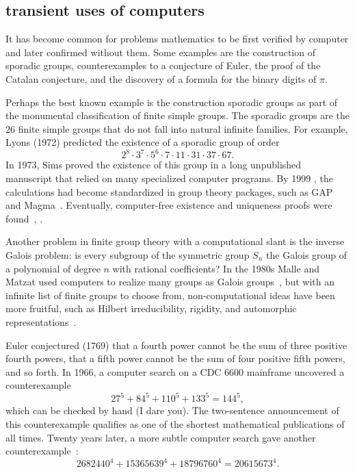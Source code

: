 \documentclass{llncs}
\begin{document}
\subsection{transient uses of computers}

It has become common for problems mathematics to be first verified by
computer and later confirmed without them.  Some examples are
the construction of sporadic groups, counterexamples to a conjecture
of Euler, the proof of the Catalan conjecture, and the discovery of a formula
for the binary digits of $\pi$.

Perhaps the best known example is the construction sporadic groups as
part of the monumental classification of finite simple groups.  The
sporadic groups are the $26$ finite simple groups that do not fall into
natural infinite families.  For example,  Lyons (1972) predicted
the existence of a sporadic group of order
\[
2^ 8\cdot 3^7\cdot 5^6\cdot  7\cdot 11 \cdot 31 \cdot 37 \cdot 67.
\]
In 1973, Sims proved the existence of this group in a long unpublished
manuscript that relied on many specialized computer programs.  By 1999
, the calculations had become standardized in group theory packages,
such as GAP and Magma~\cite{HS99}.  Eventually, computer-free
existence and uniqueness proofs were found~\cite{MParker},
\cite{AS92}.


Another problem in finite group theory with a computational slant is
the inverse Galois problem: is every subgroup of the symmetric group
$S_n$ the Galois group of a polynomial of degree $n$ with rational
coefficients?  In the 1980s Malle and Matzat used computers to realize
many groups as Galois groups~\cite{MM}, but with an infinite list of
finite groups to choose from, non-computational ideas have been more
fruitful, such as Hilbert irreducibility, rigidity, and automorphic
representations~\cite{KLS}.

\smallskip

Euler conjectured (1769) that a fourth power cannot be the sum of
three positive fourth powers, that a fifth power cannot be the sum of
four positive fifth powers, and so forth.  In 1966, a computer search
\cite{LP66} on a CDC 6600 mainframe uncovered a counterexample
\[
27^5 + 84^5 + 110^5 + 133^5 = 144^5,
\]
which can be checked by hand (I dare you).  The two-sentence
announcement of this counterexample qualifies as one of the shortest
mathematical publications of all times.  Twenty years later, a more
subtle computer search gave another counterexample~\cite{Elkies88}:
\[
2682440^4 + 15365639^4 + 18796760^4 = 20615673^4.
\]
\end{document}
